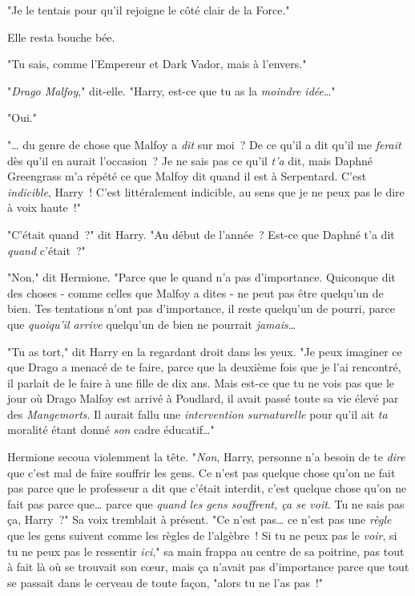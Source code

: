 "Je le tentais pour qu'il rejoigne le côté clair de la Force."

Elle resta bouche bée.

"Tu sais, comme l'Empereur et Dark Vador, mais à l'envers."

"\emph{Drago Malfoy}," dit-elle. "Harry, est-ce que tu as la \emph{moindre idée}…"

"Oui."

"… du genre de chose que Malfoy a \emph{dit} sur moi~? De ce qu'il a dit qu'il me \emph{ferait} dès qu'il en aurait l'occasion~? Je ne sais pas ce qu'il \emph{t'a} dit, mais Daphné Greengrass m'a répété ce que Malfoy dit quand il est à Serpentard. C'est \emph{indicible}, Harry~! C'est littéralement indicible, au sens que je ne peux pas le dire à voix haute~!"

"C'était quand~?" dit Harry. "Au début de l'année~? Est-ce que Daphné t'a dit \emph{quand} c'était~?"

"Non," dit Hermione. "Parce que le quand n'a pas d'importance. Quiconque dit des choses - comme celles que Malfoy a dites - ne peut pas être quelqu'un de bien. Tes tentations n'ont pas d'importance, il reste quelqu'un de pourri, parce que \emph{quoiqu'il arrive} quelqu'un de bien ne pourrait \emph{jamais}…

"Tu as tort," dit Harry en la regardant droit dans les yeux. "Je peux imaginer ce que Drago a menacé de te faire, parce que la deuxième fois que je l'ai rencontré, il parlait de le faire à une fille de dix ans. Mais est-ce que tu ne vois pas que le jour où Drago Malfoy est arrivé à Poudlard, il avait passé toute sa vie élevé par des \emph{Mangemorts}. Il aurait fallu une \emph{intervention surnaturelle} pour qu'il ait \emph{ta} moralité étant donné \emph{son} cadre éducatif…"

Hermione secoua violemment la tête. "\emph{Non}, Harry, personne n'a besoin de te \emph{dire} que c'est mal de faire souffrir les gens. Ce n'est pas quelque chose qu'on ne fait pas parce que le professeur a dit que c'était interdit, c'est quelque chose qu'on ne fait pas parce que… parce que \emph{quand les gens souffrent, ça se voit}. Tu ne sais pas ça, Harry~?" Sa voix tremblait à présent. "Ce n'est pas… ce n'est pas une \emph{règle} que les gens suivent comme les règles de l'algèbre~! Si tu ne peux pas le \emph{voir}, si tu ne peux pas le ressentir \emph{ici}," sa main frappa au centre de sa poitrine, pas tout à fait là où se trouvait son cœur, mais ça n'avait pas d'importance parce que tout se passait dans le cerveau de toute façon, "alors tu ne l'as pas~!"

